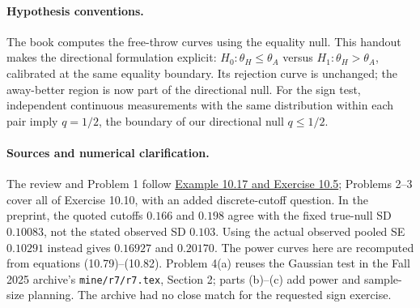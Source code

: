 \documentclass[11pt]{article}
\begin{document}
\paragraph{Hypothesis conventions.}
The book computes the free-throw curves using the equality null.
This handout makes the directional formulation explicit:
$H_0:\theta_H\leq\theta_A$ versus $H_1:\theta_H>\theta_A$, calibrated
at the same equality boundary. Its rejection curve is unchanged; the
away-better region is now part of the directional null. For the sign test,
independent continuous measurements with the same distribution within each
pair imply $q=1/2$, the boundary of our directional null $q\leq1/2$.

\paragraph{Sources and numerical clarification.}
The review and Problem 1 follow
\href{https://github.com/cfgranda/ps4ds/blob/main/ps4ds_preprint.pdf}
{Example 10.17 and Exercise 10.5}; Problems 2--3 cover all of Exercise
10.10, with an added discrete-cutoff question. In the preprint, the
quoted cutoffs $0.166$ and $0.198$ agree with the fixed true-null SD
$0.10083$, not the stated observed SD $0.103$. Using the actual observed
pooled SE $0.10291$ instead gives $0.16927$ and $0.20170$.
The power curves here are recomputed from equations (10.79)--(10.82).
Problem 4(a) reuses the Gaussian test in the Fall 2025 archive's
\texttt{mine/r7/r7.tex}, Section 2; parts (b)--(c) add power and sample-size
planning. The archive had no close match for the requested sign exercise.
\fi
\end{document}
